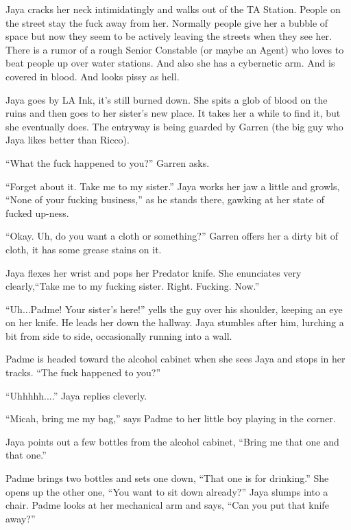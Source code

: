 Jaya cracks her neck intimidatingly and walks out of the TA Station.  People on the street stay the fuck away from her.  Normally people give her a bubble of space but now they seem to be actively leaving the streets when they see her.  There is a rumor of a rough Senior Constable (or maybe an Agent) who loves to beat people up over water stations.  And also she has a cybernetic arm.  And is covered in blood.  And looks pissy as hell.



Jaya goes by LA Ink, it's still burned down.  She spits a glob of blood on the ruins and then goes to her sister's new place.  It takes her a while to find it, but she eventually does.  The entryway is being guarded by Garren (the big guy who Jaya likes better than Ricco).

``What the fuck happened to you?'' Garren asks.

``Forget about it.  Take me to my sister.''  Jaya works her jaw a little and growls, ``None of your fucking business,''  as he stands there, gawking at her state of fucked up-ness. 

``Okay.  Uh, do you want a cloth or something?'' Garren offers her a dirty bit of cloth, it has some grease stains on it.

Jaya flexes her wrist and pops her Predator knife.  She enunciates very clearly,``Take me to my fucking sister. Right.  Fucking.  Now.''

``Uh...Padme!  Your sister's here!'' yells the guy over his shoulder, keeping an eye on her knife.  He leads her down the hallway.  Jaya stumbles after him, lurching a bit from side to side, occasionally running into a wall.



Padme is headed toward the alcohol cabinet when she sees Jaya and stops in her tracks.  ``The fuck happened to you?''

``Uhhhhh....'' Jaya replies cleverly.

``Micah, bring me my bag,'' says Padme to her little boy playing in the corner.

Jaya points out a few bottles from the alcohol cabinet, ``Bring me that one and that one.''

Padme brings two bottles and sets one down, ``That one is for drinking.'' She opens up the other one, ``You want to sit down already?''  Jaya slumps into a chair.  Padme looks at her mechanical arm and says, ``Can you put that knife away?''

